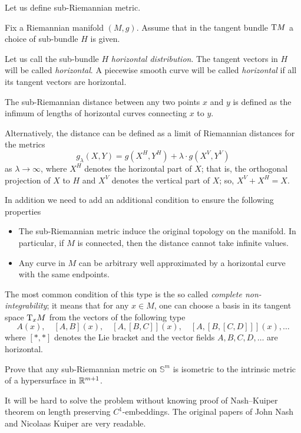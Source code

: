 Let us define sub-Riemannian metric.

Fix a Riemannian manifold $(M,g)$.
Assume that in the tangent bundle $\mathrm{T} M$ 
a choice of sub-bundle $H$ is given.

Let us call the sub-bundle $H$  \emph{horizontal distribution}.
The tangent vectors in $H$ will be called {}\emph{horizontal}.
A piecewise smooth curve will be called {}\emph{horizontal}
if all its tangent vectors are horizontal.

The sub-Riemannian distance between any two points $x$ and $y$ is defined as the infimum of lengths of horizontal curves connecting $x$ to $y$.

Alternatively, the distance can be defined as a limit of Riemannian distances 
for the metrics 
\[g_\lambda(X,Y)=g(X^H,Y^H)+\lambda\cdot g(X^V,Y^V)\] 
as $\lambda\to \infty$,
where $X^H$ denotes the horizontal part of $X$;
that is, the orthogonal projection of $X$ to $H$
and $X^V$ denotes the vertical part of $X$;
so, $X^V+X^H=X$.

In addition we need to add an additional condition to ensure the following properties 
\begin{itemize}
\item The sub-Riemannian metric induce the original topology on the manifold. 
In particular, if $M$ is connected, then the distance cannot take infinite values.
\item Any curve in $M$ can be arbitrary well approximated by a horizontal curve with the same endpoints.
\end{itemize}
The most common condition of this type is the so called {}\emph{complete non-integrability};
it means that for any $x\in M$, 
one can choose a basis in its tangent space $\mathrm{T}_xM$
from the vectors of the following type
\[A(x),\quad  [A,B](x),\quad [A,[B,C]](x),\quad [A,[B,[C,D]]](x),\dots\] 
where $[{*},{*}]$ denotes the Lie bracket 
and the vector fields $A,B,C,D, \dots$ are horizontal.

\begin{pr}
Prove that any sub-Riemannian metric 
on $\mathbb{S}^m$ is isometric to the intrinsic metric of a hypersurface in $\mathbb{R}^{m+1}$.
\end{pr}


It will be hard to solve the problem without knowing proof of Nash--Kuiper theorem on length preserving $C^1$-embeddings.
The original papers of John Nash 
and Nicolaas Kuiper \cite[see][]{nash,kuiper} are very readable.

